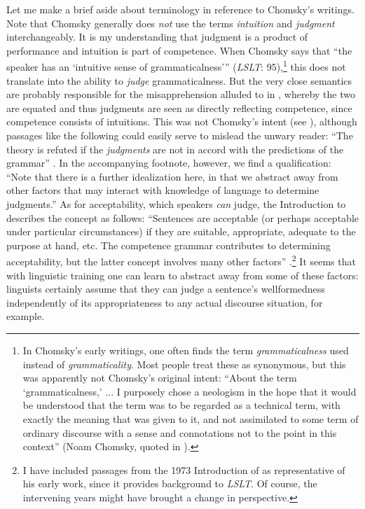 Let me make a brief aside about terminology in reference to Chomsky's writings. Note that Chomsky generally does \textit{not} use the terms \textit{intuition} and \textit{judgment} interchangeably. It is my understanding that judgment is a product of performance and intuition is part of competence. When Chomsky says that ``the speaker has an `intuitive sense of grammaticalness'” (\textit{LSLT}: 95),\footnote{In Chomsky's early writings, one often finds the term \textit{grammaticalness} used instead of \textit{grammaticality}. Most people treat these as synonymous, but this was apparently not Chomsky's original intent: ``About the term `grammaticalness,' ... I purposely chose a neologism in the hope that it would be understood that the term was to be regarded as a technical term, with exactly the meaning that was given to it, and not assimilated to some term of ordinary discourse with a sense and connotations not to the point in this context'' (Noam Chomsky, quoted in \citet[14]{Paikeday1985}).
}
this does not translate into the ability to \textit{judge} grammaticalness. But the very close semantics are probably responsible for the misapprehension alluded to in , whereby the two are equated and thus judgments are seen as directly reflecting competence, since competence consists of intuitions. This was not Chomsky's intent (see \citet[21]{Chomsky1965}), although passages like the following could easily serve to mislead the unwary reader: ``The theory is refuted if the \textit{judgments} are not in accord with the predictions of the grammar'' \citep[36]{Chomsky1985}. In the accompanying footnote, however, we find a qualification: ``Note that there is a further idealization here, in that we abstract away from other factors that may interact with knowledge of language to determine judgments.'' As for acceptability, which speakers \textit{can} judge, the Introduction to \citet{Chomsky1985} describes the concept as follows: ``Sentences are acceptable (or perhaps acceptable under particular circumstances) if they are suitable, appropriate, adequate to the purpose at hand, etc. The competence grammar contributes to determining acceptability, but the latter concept involves many other factors'' \citep[8]{Chomsky1985}.\footnote{I have included passages from the 1973 Introduction of \citet{Chomsky1985} as representative of his early work, since it provides background to \textit{LSLT}. Of course, the intervening years might have brought a change in perspective.}
It seems that with linguistic training one can learn to abstract away from some of these factors: linguists certainly assume that they can judge a sentence's wellformedness independently of its appropriateness to any actual discourse situation, for example.
 
